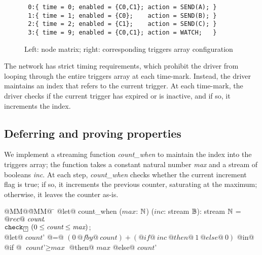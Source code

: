\begin{figure}
  \begin{minipage}{0.5\textwidth}
\end{minipage}
\begin{minipage}{0.49\textwidth}
\scriptsize
\begin{verbatim}
 0:{ time = 0; enabled = {C0,C1}; action = SEND(A); }
 1:{ time = 1; enabled = {C0};    action = SEND(B); }
 2:{ time = 2; enabled = {C1};    action = SEND(C); }
 3:{ time = 9; enabled = {C0,C1}; action = WATCH;   }
\end{verbatim}
\end{minipage}

\caption{Left: node matrix; right: corresponding triggers array configuration}
\label{f:tt-systemmatrix-ok}
\end{figure}

The network has strict timing requirements, which prohibit the driver from looping through the entire triggers array at each time-mark.
Instead, the driver maintains an index that refers to the current trigger.
At each time-mark, the driver checks if the current trigger has expired or is inactive, and if so, it increments the index.

\subsection{Deferring and proving properties}

We implement a streaming function \emph{count_when} to maintain the index into the triggers array; the function takes a constant natural number \emph{max} and a stream of booleans \emph{inc}.
At each step, \emph{count_when} checks whether the current increment flag is true; if so, it increments the previous counter, saturating at the maximum; otherwise, it leaves the counter as-is.

\begin{tabbing}
  @MM@\= @MM@ \= \kill
  @let@ count_when ($\textit{max}$: $\mathbb{N}$) ($\textit{inc}$: stream $\mathbb{B}$): stream $\mathbb{N}$ = \\
    \> $@rec@~\textit{count}\hspace{-0.1em}.~$ \\
    \> \> $\xcheckP{\PSUnknown}{(0 \le \textit{count} \le \textit{max})}$; \\
    \> \> @let@ $\textit{count'}$ @=@ $(0~@fby@~\textit{count}) + (@if@~\textit{inc}~@then@~1~@else@~0)$ @in@ \\
    \> \> @if @ $\textit{count'} \ge \textit{max}$ @then@ $\textit{max}$  @else@ $\textit{count'}$
\end{tabbing}

